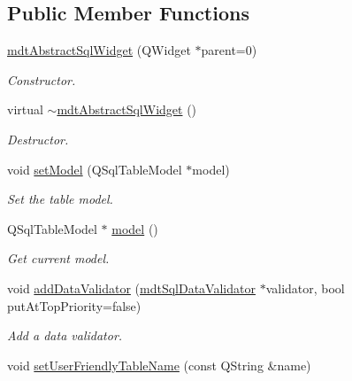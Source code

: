 \subsection*{Public Member Functions}
\begin{DoxyCompactItemize}
\item 
\hyperlink{classmdt_abstract_sql_widget_a74ef509a9487c3985fce7a4cbadbe1b3}{mdtAbstractSqlWidget} (QWidget $\ast$parent=0)
\begin{DoxyCompactList}\small\item\em Constructor. \end{DoxyCompactList}\item 
\hypertarget{classmdt_abstract_sql_widget_a46dabe9e76aaea93ff20b28863e6c0ff}{
virtual \hyperlink{classmdt_abstract_sql_widget_a46dabe9e76aaea93ff20b28863e6c0ff}{$\sim$mdtAbstractSqlWidget} ()}
\label{classmdt_abstract_sql_widget_a46dabe9e76aaea93ff20b28863e6c0ff}

\begin{DoxyCompactList}\small\item\em Destructor. \end{DoxyCompactList}\item 
void \hyperlink{classmdt_abstract_sql_widget_a8971862741e1ef79c79e11b37e955476}{setModel} (QSqlTableModel $\ast$model)
\begin{DoxyCompactList}\small\item\em Set the table model. \end{DoxyCompactList}\item 
QSqlTableModel $\ast$ \hyperlink{classmdt_abstract_sql_widget_a298d40a6540aeabbb7644e3c4fd9f3ea}{model} ()
\begin{DoxyCompactList}\small\item\em Get current model. \end{DoxyCompactList}\item 
void \hyperlink{classmdt_abstract_sql_widget_a0ccf93f41b1d7c479bfe0a52df2aac06}{addDataValidator} (\hyperlink{classmdt_sql_data_validator}{mdtSqlDataValidator} $\ast$validator, bool putAtTopPriority=false)
\begin{DoxyCompactList}\small\item\em Add a data validator. \end{DoxyCompactList}\item 
\hypertarget{classmdt_abstract_sql_widget_ac3fe33cfebb07d461ca06ee838a9b979}{
void \hyperlink{classmdt_abstract_sql_widget_ac3fe33cfebb07d461ca06ee838a9b979}{setUserFriendlyTableName} (const QString \&name)}
\label{classmdt_abstract_sql_widget_ac3fe33cfebb07d461ca06ee838a9b979}


\end{DoxyCompactItemize}
